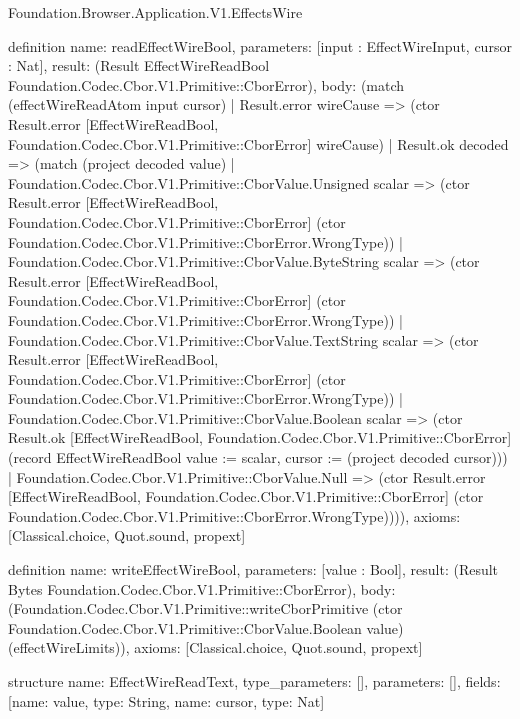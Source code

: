 \begin{lexlean}{Foundation.Browser.Application.V1.EffectsWire}
\begin{semanticmodule}
definition{
  name: readEffectWireBool,
  parameters: [input : EffectWireInput, cursor : Nat],
  result: (Result EffectWireReadBool Foundation.Codec.Cbor.V1.Primitive::CborError),
  body: (match (effectWireReadAtom input cursor)
    | Result.error wireCause => (ctor Result.error [EffectWireReadBool, Foundation.Codec.Cbor.V1.Primitive::CborError] wireCause)
    | Result.ok decoded => (match (project decoded value)
      | Foundation.Codec.Cbor.V1.Primitive::CborValue.Unsigned scalar => (ctor Result.error [EffectWireReadBool, Foundation.Codec.Cbor.V1.Primitive::CborError] (ctor Foundation.Codec.Cbor.V1.Primitive::CborError.WrongType))
      | Foundation.Codec.Cbor.V1.Primitive::CborValue.ByteString scalar => (ctor Result.error [EffectWireReadBool, Foundation.Codec.Cbor.V1.Primitive::CborError] (ctor Foundation.Codec.Cbor.V1.Primitive::CborError.WrongType))
      | Foundation.Codec.Cbor.V1.Primitive::CborValue.TextString scalar => (ctor Result.error [EffectWireReadBool, Foundation.Codec.Cbor.V1.Primitive::CborError] (ctor Foundation.Codec.Cbor.V1.Primitive::CborError.WrongType))
      | Foundation.Codec.Cbor.V1.Primitive::CborValue.Boolean scalar => (ctor Result.ok [EffectWireReadBool, Foundation.Codec.Cbor.V1.Primitive::CborError] (record EffectWireReadBool {value := scalar, cursor := (project decoded cursor)}))
      | Foundation.Codec.Cbor.V1.Primitive::CborValue.Null => (ctor Result.error [EffectWireReadBool, Foundation.Codec.Cbor.V1.Primitive::CborError] (ctor Foundation.Codec.Cbor.V1.Primitive::CborError.WrongType)))),
  axioms: [Classical.choice, Quot.sound, propext]
}

definition{
  name: writeEffectWireBool,
  parameters: [value : Bool],
  result: (Result Bytes Foundation.Codec.Cbor.V1.Primitive::CborError),
  body: (Foundation.Codec.Cbor.V1.Primitive::writeCborPrimitive (ctor Foundation.Codec.Cbor.V1.Primitive::CborValue.Boolean value) (effectWireLimits)),
  axioms: [Classical.choice, Quot.sound, propext]
}

structure{
  name: EffectWireReadText,
  type_parameters: [],
  parameters: [],
  fields: [{name: value, type: String}, {name: cursor, type: Nat}]
}


\end{semanticmodule}
\end{lexlean}
